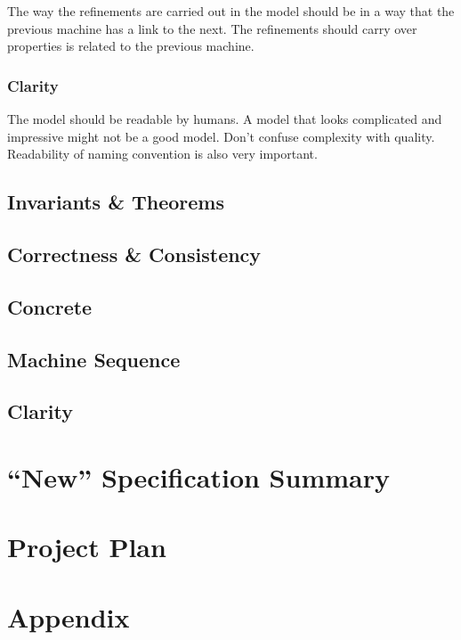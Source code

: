 The way the refinements are carried out in the model should be in a way that the previous machine has a link to the next. The refinements should carry over properties is related to the previous machine.

\subsection{Clarity}
\label{clarity}

The model should be readable by humans. A model that looks complicated and impressive might not be a good model. Don't confuse complexity with quality. Readability of naming convention is also very important.

\section{Invariants \& Theorems}
\label{invariantstheorems}

\section{Correctness \& Consistency}
\label{correctnessconsistency}

\section{Concrete}
\label{concrete}

\section{Machine Sequence}
\label{machinesequence}

\section{Clarity}
\label{clarity}

\chapter{``New'' Specification Summary}
\label{newspecificationsummary}

\chapter{Project Plan}
\label{projectplan}

\chapter{Appendix}
\label{appendix}




